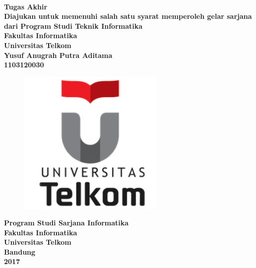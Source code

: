 \documentclass[../Book, Implementasi Algoritma Merging Context Seeds untuk Plagiarism Detection.tex]{subfiles}
\begin{document}
\begin{titlepage}
	\begin{center}
		\fontsize{16}{1}\textbf{\judulta{}}\\[1.5cm]
		\fontsize{12}{1}
		\textbf{Tugas Akhir}\\[1.5cm]
		\textbf{Diajukan untuk memenuhi salah satu syarat memperoleh gelar sarjana dari Program Studi Teknik Informatika\\Fakultas Informatika\\Universitas Telkom}\\[2cm]
		\textbf{Yusuf Anugrah Putra Aditama\\1103120030}\\
		\begin{figure}[h]
			\centering
			\includegraphics[width=200pt]{../images/telu}\\[2cm]
		\end{figure}
		\fontsize{16}{1}\textbf{Program Studi Sarjana Informatika} \\
		\fontsize{16}{1}\textbf{Fakultas Informatika}\\
		\fontsize{16}{1}\textbf{Universitas Telkom}\\
		\fontsize{16}{1}\textbf{Bandung}\\
		\fontsize{16}{1}\textbf{2017}
	\end{center}
\end{titlepage}
\end{document}

